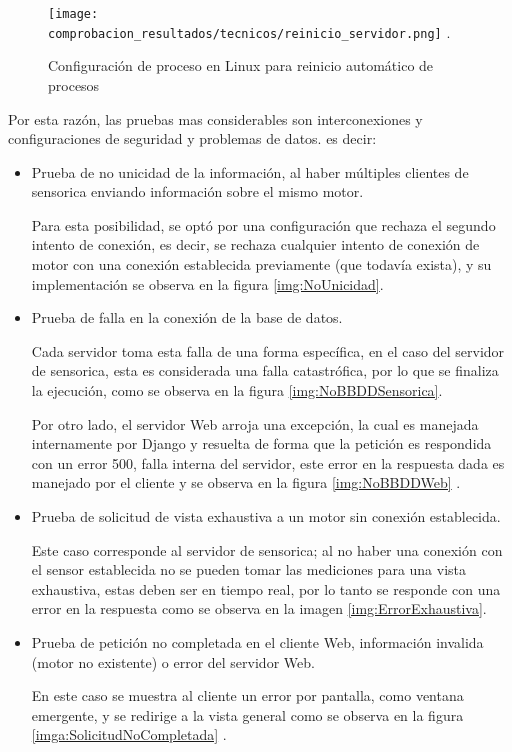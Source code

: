 	\begin{figure}[htb]
		\centering
        \caption{Configuración de proceso en Linux para reinicio automático de procesos}
        \texttt{[image: comprobacion\_resultados/tecnicos/reinicio\_servidor.png]}
        \textcite{ConfiguracionProcesos}.
        \label{img:ProcesosLinux}
	\end{figure}

Por esta razón, las pruebas mas considerables son interconexiones y configuraciones
de seguridad y problemas de datos. es decir:

\begin{itemize}
    \item Prueba de no unicidad de la información, al haber múltiples
        clientes de sensorica enviando información sobre el mismo motor.

        Para esta posibilidad, se optó por una configuración que rechaza el
        segundo intento de conexión, es decir, se rechaza cualquier intento de
        conexión de motor con una conexión establecida previamente (que todavía
        exista), y su implementación se observa en la figura \ref{img:NoUnicidad}.
%
    \item Prueba de falla en la conexión de la base de datos.

        Cada servidor toma esta falla de una forma específica, en el caso del
        servidor de sensorica, esta es considerada una falla catastrófica, por
        lo que se finaliza la ejecución, como se observa en la figura
        \ref{img:NoBBDDSensorica}.

        Por otro lado, el servidor Web arroja una excepción, la cual es manejada
        internamente por Django y resuelta de forma que la petición es respondida
        con un error 500, falla interna del servidor, este error en la respuesta
        dada es manejado por el cliente y se observa en la figura
        \ref{img:NoBBDDWeb} .
%
    \item Prueba de solicitud de vista exhaustiva a un motor sin conexión
        establecida.

        Este caso corresponde al servidor de sensorica; al no haber una conexión
        con el sensor establecida no se pueden tomar las mediciones para una vista
        exhaustiva, estas deben ser en tiempo real, por lo tanto se responde
        con una error en la respuesta como se observa en la imagen \ref{img:ErrorExhaustiva}.
%
    \item Prueba de petición no completada en el cliente Web,
        información invalida (motor no existente) o error del servidor Web.

        En este caso se muestra al cliente un error por pantalla, como ventana
        emergente, y se redirige a la vista general como se observa en la figura \ref{imga:SolicitudNoCompletada}  .
\end{itemize}


